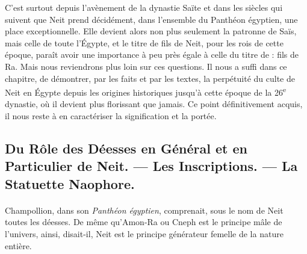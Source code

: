 \documentclass[a4paper, 11pt, oneside]{article}
\begin{document}
C'est surtout depuis l'avènement de la dynastie Saïte et dans les siècles qui suivent que Neit prend décidément, dans l'ensemble du Panthéon égyptien, une place exceptionnelle. Elle devient alors non plus seulement la patronne de Saïs, mais celle de toute l'Égypte, et le titre de fils de Neit, pour les rois de cette époque, paraît avoir une importance à peu près égale à celle du titre de : fils de Ra. Mais nous reviendrons plus loin sur ces questions. Il nous a suffi dans ce chapitre, de démontrer, par les faits et par les textes, la perpétuité du culte de Neit en Égypte depuis les origines historiques jusqu'à cette époque de la 26\textsuperscript{e} dynastie, où il devient plus florissant que jamais. Ce point définitivement acquis, il nous reste à en caractériser la signification et la portée.
\clearpage
\subsection{Du Rôle des Déesses en Général et en Particulier de Neit. --- Les Inscriptions. --- La Statuette Naophore.}
\paragraph{}
Champollion, dans son \emph{Panthéon égyptien}, comprenait, sous le nom de Neit toutes les déesses. De même qu'Amon-Ra ou Cneph est le principe mâle de l'univers, ainsi, disait-il, Neit est le principe générateur femelle de la nature entière.
\end{document}
